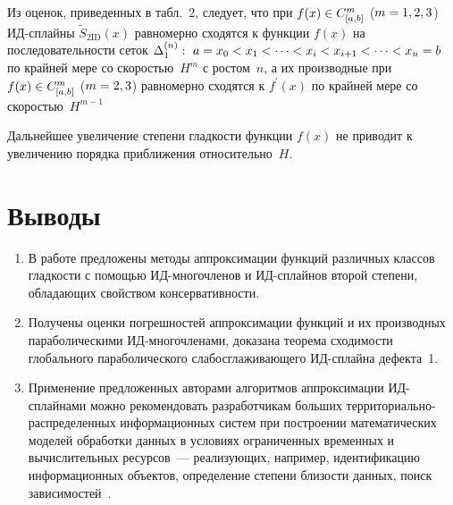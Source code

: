 \begin{multicols}{2}
  
  Из оценок, приведенных в табл.~2, следует, что при $f(x)\hm\in C^m_{[a,b]}$ 
($m\hm=1,2,3$) ИД-сплай\-ны $\tilde{S}_{2\mathrm{ID}}(x)$ равномерно сходятся к 
функции $f(x)$ на последовательности сеток $\Delta_1^{(n)}:\ 
a\hm=x_0\hm<x_1<\cdots < x_i \hm< x_{i+1}<\cdots < x_n\hm=b$ по крайней 
мере со ско\-ростью~$H^m$ с ростом~$n$, а их производные при $f(x)\hm\in 
C^m_{[a,b]}$ ($m\hm=2,3$) равномерно сходятся к $f^\prime(x)$ по крайней 
мере со скоростью~$H^{m-1}$
  
  Дальнейшее увеличение степени гладкости функции $f(x)$ не приводит к 
увеличению порядка приближения относительно~$H$.

\vspace*{-6pt}

\section*{Выводы}

\noindent
\begin{enumerate}[1.]
  \item  В работе предложены методы аппроксимации функций различных 
классов гладкости с по\-мощью ИД-многочленов и 
ИД-сплай\-нов второй степени, обладающих свойством консервативности.
  \item Получены оценки погрешностей аппроксимации функций и их 
производных параболическими ИД-мно\-го\-чле\-на\-ми, доказана теорема 
сходимости глобального параболического слабосглаживающего ИД-сплай\-на 
дефекта~1. 
  \item Применение предложенных авторами алгоритмов аппроксимации 
  ИД-сплай\-на\-ми можно рекомендовать разработчикам больших 
  тер\-ри\-то\-ри\-аль\-но-рас\-пре\-де\-лен\-ных информационных %
  сис\-тем при 
построении математических моде\-лей обработки данных в условиях 
ограниченных временных и вычислительных ресурсов~--- реализующих, 
например, идентификацию %
инфор\-ма\-ци\-он\-ных объектов, определение степени 
близости данных, поиск зависимостей~\mbox{\cite{1-kir, 7-kir}}.
\end{enumerate}


\end{multicols}
